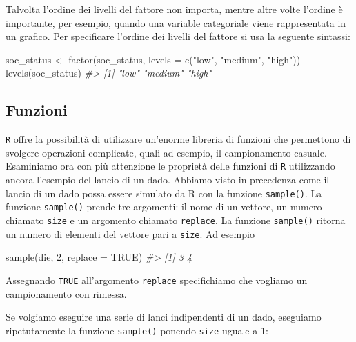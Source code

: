 \documentclass[
  11pt,
]{krantz}
\makeatletter
\newenvironment{Shaded}{\begin{snugshade}}{\end{snugshade}}
\newcommand{\AttributeTok}[1]{\textcolor[rgb]{0.61,0.61,0.61}{#1}}
\newcommand{\CommentTok}[1]{\textcolor[rgb]{0.37,0.37,0.37}{\textit{#1}}}
\newcommand{\ConstantTok}[1]{\textcolor[rgb]{0,0,0}{#1}}
\newcommand{\DecValTok}[1]{\textcolor[rgb]{0.06,0.06,0.06}{#1}}
\newcommand{\FunctionTok}[1]{\textcolor[rgb]{0,0,0}{#1}}
\newcommand{\NormalTok}[1]{#1}
\newcommand{\OtherTok}[1]{\textcolor[rgb]{0.37,0.37,0.37}{#1}}
\newcommand{\StringTok}[1]{\textcolor[rgb]{0.5,0.5,0.5}{#1}}
\newenvironment{kframe}{%
\medskip{}
\setlength{\fboxsep}{.8em}
 \def\at@end@of@kframe{}%
 \ifinner\ifhmode%
  \def\at@end@of@kframe{\end{minipage}}%
  \begin{minipage}{\columnwidth}%
 \fi\fi%
 \def\FrameCommand##1{\hskip\@totalleftmargin \hskip-\fboxsep
 \colorbox{shadecolor}{##1}\hskip-\fboxsep
     \hskip-\linewidth \hskip-\@totalleftmargin \hskip\columnwidth}%
 \MakeFramed {\advance\hsize-\width
   \@totalleftmargin\z@ \linewidth\hsize
   \@setminipage}}%
 {\par\unskip\endMakeFramed%
 \at@end@of@kframe}
\renewenvironment{Shaded}{\begin{kframe}}{\end{kframe}}
\theoremstyle{definition}
\theoremstyle{definition}
\theoremstyle{definition}
\theoremstyle{definition}
\theoremstyle{remark}
\makeatother
\begin{document}
Talvolta l'ordine dei livelli del fattore non importa, mentre altre volte l'ordine è importante, per esempio, quando una variable categoriale viene rappresentata in un grafico. Per specificare l'ordine dei livelli del fattore si usa la seguente sintassi:

\begin{Shaded}
\begin{Highlighting}[]
\NormalTok{soc\_status }\OtherTok{\textless{}{-}} 
  \FunctionTok{factor}\NormalTok{(soc\_status, }\AttributeTok{levels =} \FunctionTok{c}\NormalTok{(}\StringTok{"low"}\NormalTok{, }\StringTok{"medium"}\NormalTok{, }\StringTok{"high"}\NormalTok{))}
\FunctionTok{levels}\NormalTok{(soc\_status)}
\CommentTok{\#\textgreater{} [1] "low"    "medium" "high"}
\end{Highlighting}
\end{Shaded}

\hypertarget{funzioni}{%
\subsection{Funzioni}\label{funzioni}}

\texttt{R} offre la possibilità di utilizzare un'enorme libreria di funzioni che permettono di svolgere operazioni complicate, quali ad esempio, il campionamento casuale. Esaminiamo ora con più attenzione le proprietà delle funzioni di \texttt{R} utilizzando ancora l'esempio del lancio di un dado. Abbiamo visto in precedenza come il lancio di un dado possa essere simulato da R con la funzione \texttt{sample()}. La funzione \texttt{sample()} prende tre argomenti: il nome di un vettore, un numero chiamato \texttt{size} e un argomento chiamato \texttt{replace}. La funzione \texttt{sample()} ritorna un numero di elementi del vettore pari a \texttt{size}. Ad esempio

\begin{Shaded}
\begin{Highlighting}[]
\FunctionTok{sample}\NormalTok{(die, }\DecValTok{2}\NormalTok{, }\AttributeTok{replace =} \ConstantTok{TRUE}\NormalTok{)}
\CommentTok{\#\textgreater{} [1] 3 4}
\end{Highlighting}
\end{Shaded}

Assegnando \texttt{TRUE} all'argomento \texttt{replace} specifichiamo che vogliamo un campionamento con rimessa.

Se volgiamo eseguire una serie di lanci indipendenti di un dado, eseguiamo ripetutamente la funzione \texttt{sample()} ponendo \texttt{size} uguale a 1:
\end{document}

